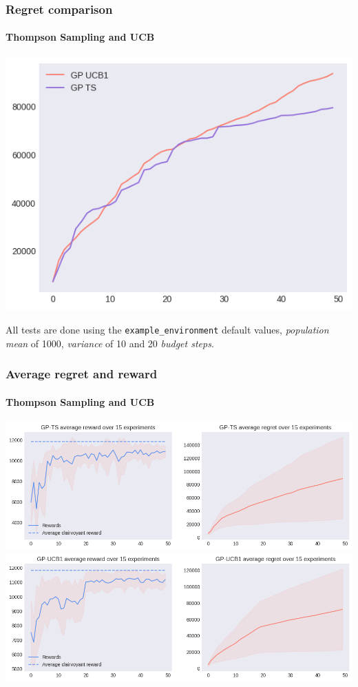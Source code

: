 \begin{frame}[plain]

\frametitle{Regret comparison}
\framesubtitle{Thompson Sampling and UCB}

\begin{center}
	\includegraphics[scale=0.5]{img/Graphs/uncertain_alpha_unit/image3.png}
\end{center}

\scriptsize All tests are done using the \texttt{example\_environment} default values, \textit{population mean} of 1000, \textit{variance} of 10 and 20 \textit{budget steps}.

\end{frame}


\begin{frame}[plain]

\frametitle{Average regret and reward}
\framesubtitle{Thompson Sampling and UCB}

\begin{center}
	\includegraphics[scale=0.4]{img/Graphs/uncertain_alpha_unit/image4.png}
	\includegraphics[scale=0.4]{img/Graphs/uncertain_alpha_unit/image5.png}
\end{center}

\end{frame}

